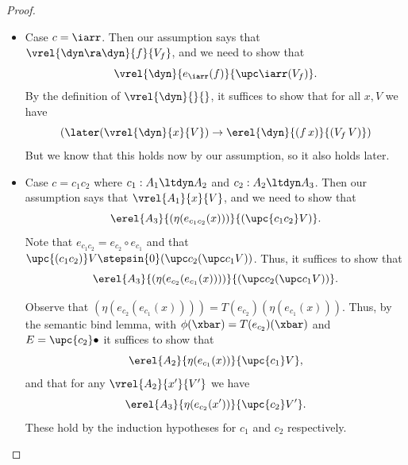 \begin{proof}
\begin{itemize}
        
        \item Case $c = \iarr$.
        Then our assumption says that $\vrel{\dyn \ra \dyn}{f}{V_f}$, and we need to show that
        \[ \vrel{\dyn}{e_{\iarr}(f)}{\upc \iarr (V_f)}. \]
        By the definition of $\vrel{\dyn}{}{}$, it suffices to show that for all $x, V$ we have
        \[ (\later(\vrel{\dyn}{x}{V}) \to \erel{\dyn}{(f\, x)}{(V_f\, V)}) \]
        But we know that this holds now by our assumption, so it also holds later.

        


        \item Case $c = c_1 c_2$ where $c_1 : A_1 \ltdyn A_2$ and $c_2 : A_2 \ltdyn A_3$.
        Then our assumption says that $\vrel{A_1}{x}{V}$, and we need to show that
        \[ \erel{A_3} {(\eta(e_{c_1 c_2}(x)))} {(\upc {c_1 c_2} V)}. \]
        Note that $e_{c_1 c_2} = e_{c_2} \circ e_{c_1}$ and that 
        $\upc {(c_1 c_2)} V \stepsin{0} (\upc c_2 (\upc c_1 V))$.
        Thus, it suffices to show that
        \[ \erel{A_3} {(\eta(e_{c_2}(e_{c_1}(x))))} {(\upc c_2 (\upc c_1 V))}. \]
        
        Observe that $(\eta(e_{c_2}(e_{c_1}(x)))) = T(e_{c_2})(\eta(e_{c_1}(x)))$.
        Thus, by the semantic bind lemma, with $\phi(\xbar) = T(e_{c_2})(\xbar)$
        and $E = \upc {c_2} \bullet$ it suffices to show that
        \[ \erel{A_2}{\eta(e_{c_1}(x))}{\upc {c_1} V}, \]
        and that for any $\vrel{A_2}{x'}{V'}$ we have %
        \[ \erel{A_3}{\eta(e_{c_2}(x'))}{\upc {c_2} V'}. \]
        These hold by the induction hypotheses for $c_1$ and $c_2$ respectively.



\end{itemize}
\end{proof}

